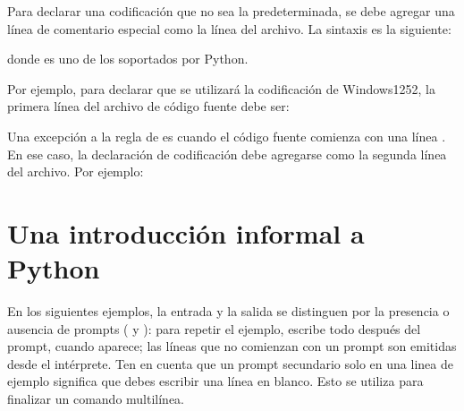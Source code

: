 \documentclass[a5paper,10pt,spanish]{sphinxmanual}
\begin{document}
\sphinxAtStartPar
Para declarar una codificación que no sea la predeterminada, se debe agregar una línea de comentario especial como la  línea del archivo. La sintaxis es la siguiente:

\begin{sphinxVerbatim}[commandchars=\\\{\}]
\end{sphinxVerbatim}

\sphinxAtStartPar
donde  es uno de los  soportados por Python.

\sphinxAtStartPar
Por ejemplo, para declarar que se utilizará la codificación de Windows\sphinxhyphen{}1252, la primera línea del archivo de código fuente debe ser:

\begin{sphinxVerbatim}[commandchars=\\\{\}]
\end{sphinxVerbatim}

\sphinxAtStartPar
Una excepción a la regla de  es cuando el código fuente comienza con una línea {\hyperref[\detokenize{tutorial/appendix:tut-scripts}]{}}. En ese caso, la declaración de codificación debe agregarse como la segunda línea del archivo. Por ejemplo:

\begin{sphinxVerbatim}[commandchars=\\\{\}]
\end{sphinxVerbatim}


\chapter{Una introducción informal a Python}
\label{\detokenize{tutorial/introduction:an-informal-introduction-to-python}}\label{\detokenize{tutorial/introduction:tut-informal}}\label{\detokenize{tutorial/introduction::doc}}
\sphinxAtStartPar
En los siguientes ejemplos, la entrada y la salida se distinguen por la presencia o ausencia de prompts ({\hyperref[\detokenize{glossary:term-0}]{}} y {\hyperref[\detokenize{glossary:term-...}]{}}): para repetir el ejemplo, escribe todo después del prompt, cuando aparece; las líneas que no comienzan con un prompt son emitidas desde el intérprete. Ten en cuenta que un prompt secundario solo en una linea de ejemplo significa que debes escribir una línea en blanco. Esto se utiliza para finalizar un comando multilínea.
\end{document}
